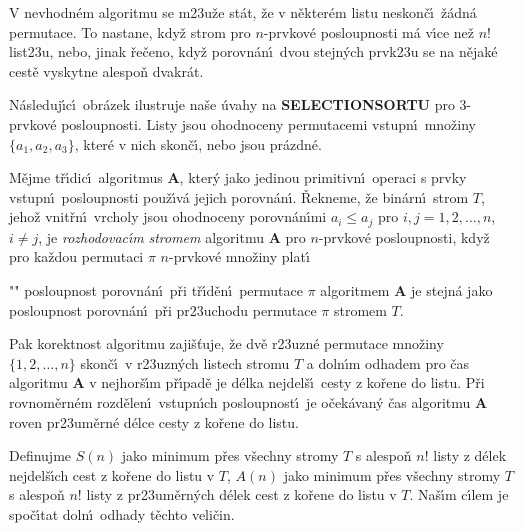 \documentclass[a4paper,12pt]{article}
\begin{document}
\flushpar V nevhodn\'em algoritmu se m\accent23u\v ze st\'at, \v ze 
v n\v ekter\'em listu neskon\v c\'\i\ \v z\'adn\'a permutace. To  
nastane, kdy\v z strom pro $n$-prvkov\'e posloupnosti m\'a v\'\i ce 
ne\v z $n!$ list\accent23u, nebo, jinak \v re\v ceno, kdy\v z 
porovn\'an\'\i\ dvou stejn\'ych prvk\accent23u se na n\v ejak\'e cest\v e 
vyskytne alespo\v n dvakr\'at. 
\medskip

\flushpar N\'asleduj\'\i c\'\i\ obr\'azek ilustruje na\v se \'uvahy na 
{\bf SELECTIONSORTU} pro $3$-prvkov\'e posloupnosti. Listy jsou 
ohodnoceny permutacemi vstupn\'\i\ mno\v ziny 
$\{a_1,a_2,a_3\}$, kter\'e v nich 
skon\v c\'\i , nebo jsou pr\'azdn\'e. 
\midinsert
\centerline{}
\endcaption
\endinsert
\medskip

M\v ejme t\v r\'\i dic\'\i\ algoritmus {\bf A}, kter\'y 
jako jedinou pri\-mitivn\'\i\ operaci s prvky vstupn\'\i\ 
posloupnosti pou\v z\'\i v\'a jejich porov\-n\'an\'\i . \v Rekneme, \v ze bin\'arn\'\i\ 
strom $T$, jeho\v z vnit\v rn\'\i\ vrcholy jsou ohodnoceny 
porovn\'an\'\i mi  $a_i\le a_j$ pro $i,j=1,2,\dots,n$, $i\ne j$, je 
\emph{rozhodovac\'\i m} \emph{stromem} algoritmu {\bf A} pro 
$n$-prvkov\'e posloupnosti, kdy\v z pro ka\v zdou permutaci $\pi$
$n$-prvkov\'e mno\v ziny plat\'\i\ 
\roster
\item"{}"
posloupnost porovn\'an\'\i\ p\v ri t\v r\'\i d\v en\'\i\ permutace $
\pi$ 
algoritmem {\bf A} je stejn\'a jako po\-sloupnost porovn\'an\'\i\ p\v ri 
pr\accent23uchodu permutace $\pi$ stromem $T$.
\endroster
\enddefinition
\medskip

\flushpar Pak korektnost algoritmu zaji\v s\v tuje, \v ze dv\v e r\accent23uzn\'e 
permutace mno\v ziny $\{1,2,\dots,n\}$ skon\v c\'\i\ v 
r\accent23uzn\'ych listech stromu $T$ a dol\-n\'\i m odhadem pro 
\v cas algoritmu {\bf A} v nej\-hor\v s\'\i m p\v r\'\i pad\v e je d\'elka nejdel\v s\'\i\ 
cesty z ko\v rene do listu.  
P\v ri rovnom\v ern\'em 
rozd\v elen\'\i\ vstupn\'\i ch po\-sloupnost\'\i\ je o\v cek\'avan\'y \v cas 
algoritmu {\bf A} roven pr\accent23um\v ern\'e d\'elce cesty z ko\v rene do 
listu.  
\medskip

\flushpar Definujme\newline 
$S(n)$ jako minimum p\v res v\v sechny stromy $T$ s alespo\v n $n
!$ listy z 
d\'elek nejdel\v s\'\i ch cest z ko\v rene 
do listu v $T$, \newline 
$A(n)$ jako minimum p\v res v\v sechny stromy $T$ s alespo\v n $n
!$ listy z
pr\accent23um\v ern\'ych d\'elek cest z ko\v rene do listu v $T$.\newline 
Na\v s\'\i m c\'\i lem je spo\v c\'\i tat doln\'\i\ odhady t\v echto veli\v cin.
\medskip
\end{document}
